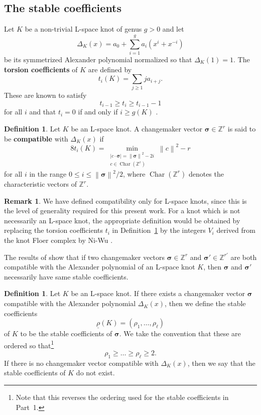 \documentclass{amsart} %
\newcommand{\Z}{\mathbb{Z}}
\newcommand{\bsigma}{\bm{\sigma}}
\newcommand{\norm}[1]{\left\lVert #1 \right\rVert^2}
\theoremstyle{thm}
\theoremstyle{definition}
\newtheorem{defi}[Theorem]{Definition}
\newtheorem{rem}[Theorem]{Remark}
\numberwithin{equation}{section}
\begin{document}
\subsection{The stable coefficients}
Let $K$ be a non-trivial L-space knot of genus $g>0$ and let
\begin{equation*}
\Delta_K(x)=a_0+\sum_{i=1}^g a_i(x^i+x^{-i})
\end{equation*}
be its symmetrized Alexander polynomial normalized so that $\Delta_K(1)=1$. The \textbf{torsion coefficients} of $K$ are defined by
\begin{equation*}
t_i(K)=\sum_{j\geq 1} j a_{i+j}.
\end{equation*}
These are known to satisfy
\[
t_{i-1}\geq t_i\geq t_{i-1}-1
\]
for all $i$ and that $t_i=0$ if and only if $i\geq g(K)$ \cite{OS05b}.

\begin{defi}\label{def:compatibility}
Let $K$ be an L-space knot. A changemaker vector $\bsigma\in \Z^r$ is said to be {\bf compatible} with $\Delta_K(x)$ if 
   \begin{equation}\label{eq:sigma_ti_relation}
    8t_i(K)=\min_{\substack{ |c\cdot \bsigma|= \norm{\bsigma}-2i \\ c \in \operatorname{Char}(\Z^r)}}   \norm{c} -r 
\end{equation}
    for all $i$ in the range $0\leq i \leq \norm{\bsigma}/2$, where $\operatorname{Char}(\Z^r)$ denotes the characteristic vectors of $\Z^r$.
\end{defi}
\begin{rem}
    We have defined compatibility only for L-space knots, since this is the level of generality required for this present work. For a knot which is not necessarily an L-space knot, the appropriate definition would be obtained by replacing the torsion coefficients $t_i$ in Definition~\ref{def:compatibility} by the integers $V_i$ derived from the knot Floer complex by Ni-Wu \cite{NiWu_Cosmetic}.
\end{rem}
The results of \cite[\S2]{Mc17} show that if two changemaker vectors $\bsigma\in \Z^r$ and $\bsigma'\in \Z^{r'}$ are both compatible with the Alexander polynomial of an L-space knot $K$, then $\bsigma$ and $\bsigma'$ necessarily have same stable coefficients.
\begin{defi}\label{def:stable_coefs_knot}
    Let $K$ be an L-space knot. If there exists a changemaker vector $\bsigma$ compatible with the Alexander polynomial $\Delta_K(x)$, then we define the stable coefficients
    \[
    \underline{\rho}(K)=(\rho_1,\dots, \rho_\ell)
    \]
    of $K$ to be the stable coefficients of $\bsigma$. We take the convention that these are ordered so that\footnote{Note that this reverses the ordering used for the stable coefficients in Part~1.}
    \[
    \rho_1\geq \dots \geq \rho_\ell\geq 2.
    \]
    If there is no changemaker vector compatible with $\Delta_K(x)$, then we say that the stable coefficients of $K$ do not exist.
\end{defi}
\end{document}
